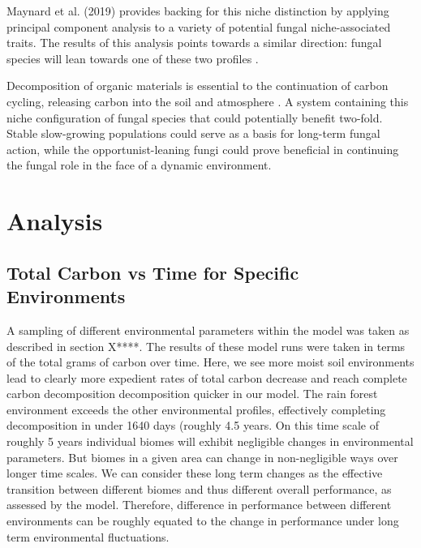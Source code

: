 \documentclass{article}
\begin{document}
Maynard et al. (2019) provides backing for this niche distinction by applying principal component analysis to a variety of potential fungal niche-associated traits. The results of this analysis points towards a similar direction: fungal species will lean towards one of these two profiles \cite{Maynard2019}.

Decomposition of organic materials is essential to the continuation of carbon cycling, releasing carbon into the soil and atmosphere \cite{Lustenhouwer2019}. A system containing this niche configuration of fungal species that could potentially benefit two-fold. Stable slow-growing populations could serve as a basis for long-term fungal action, while the opportunist-leaning fungi could prove beneficial in continuing the fungal role in the face of a dynamic environment.


\section{Analysis}


\subsection{Total Carbon vs Time for Specific Environments} %
 A sampling of different environmental parameters within the model was taken as described in section X****. The results of these model runs were taken in terms of the total grams of carbon over time. Here, we see more moist soil environments lead to clearly more expedient rates of total carbon decrease and reach complete carbon decomposition decomposition quicker in our model. The rain forest environment exceeds the other environmental profiles, effectively completing decomposition in under 1640 days (roughly 4.5 years. On this time scale of roughly 5 years individual biomes will exhibit negligible changes in environmental parameters. But biomes in a given area can change in non-negligible ways over longer time scales. We can consider these long term changes as the effective transition between different biomes and thus different overall performance, as assessed by the model. Therefore, difference in performance between different environments can be roughly equated to the change in performance under long term environmental fluctuations. 
 
\end{document}
